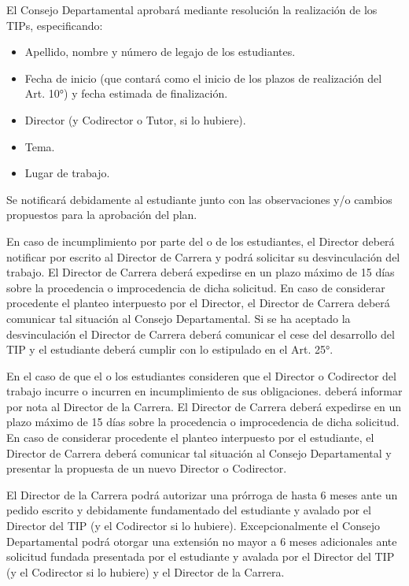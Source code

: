 \articulo El Consejo Departamental aprobará mediante resolución la
realización de los TIPs, especificando:
\begin{itemize}
 \item Apellido, nombre y número de legajo de los estudiantes.
 \item Fecha de inicio (que contará como el inicio de los plazos de
 realización del Art. 10°) y fecha estimada de finalización.
 \item Director (y Codirector o Tutor, si lo hubiere).
 \item Tema.
 \item Lugar de trabajo.
\end{itemize}

Se notificará debidamente al estudiante junto con las observaciones y/o cambios
propuestos para la aprobación del plan.


\articulo En caso de incumplimiento por parte del o de los estudiantes, el
Director deberá notificar por escrito al Director de Carrera y podrá solicitar su
desvinculación del trabajo. El Director de Carrera deberá expedirse en un plazo
máximo de 15 días sobre la procedencia o improcedencia de dicha solicitud. En caso
de considerar procedente el planteo interpuesto por el Director, el Director de Carrera
deberá comunicar tal situación al Consejo Departamental. Si se ha aceptado la
desvinculación el Director de Carrera deberá comunicar el cese del desarrollo del TIP
y el estudiante deberá cumplir con lo estipulado en el Art. 25°.

\articulo En el caso de que el o los estudiantes consideren que el Director
o Codirector del trabajo incurre o incurren en incumplimiento de sus obligaciones.
deberá informar por nota al Director de la Carrera. El Director de Carrera deberá
expedirse en un plazo máximo de 15 días sobre la procedencia o improcedencia de
dicha solicitud. En caso de considerar procedente el planteo interpuesto por el
estudiante, el Director de Carrera deberá comunicar tal situación al Consejo
Departamental y presentar la propuesta de un nuevo Director o Codirector. 

\articulo El Director de la Carrera podrá autorizar una prórroga de hasta 6
meses ante un pedido escrito y debidamente fundamentado del estudiante y avalado
por el Director del TIP (y el Codirector si lo hubiere). Excepcionalmente el Consejo
Departamental podrá otorgar una extensión no mayor a 6 meses adicionales ante
solicitud fundada presentada por el estudiante y avalada por el Director del TIP (y el
Codirector si lo hubiere) y el Director de la Carrera. 

